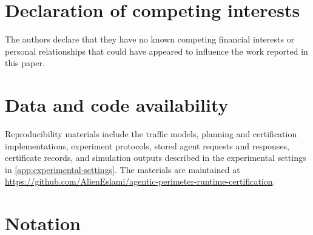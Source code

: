 \documentclass[preprint,12pt]{elsarticle}
\theoremstyle{definition}
\theoremstyle{plain}
\theoremstyle{definition}
\theoremstyle{plain}
\newcommand{\appref}[1]{\ref{#1}}
\begin{document}
\section*{Declaration of competing interests}
The authors declare that they have no known competing financial interests or
personal relationships that could have appeared to influence the work
reported in this paper.

\section*{Data and code availability}
Reproducibility materials include the traffic models, planning and
certification implementations, experiment protocols, stored agent requests
and responses, certificate records, and simulation outputs described in the
experimental settings in \appref{app:experimental-settings}. The materials are maintained at
\url{https://github.com/AlienEslami/agentic-perimeter-runtime-certification}.


\appendix
\renewcommand{\theequation}{\Alph{section}.\arabic{equation}}
\renewcommand{\thetable}{\Alph{section}.\arabic{table}}
\Needspace{0.78\textheight}
\section{Notation}
\label{app:notation}
\end{document}
